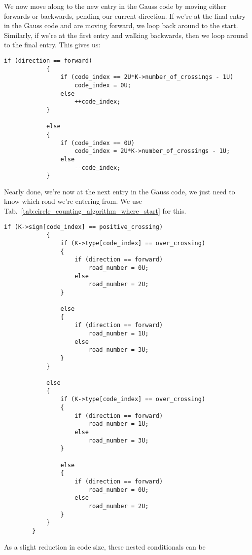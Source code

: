         We now move along to the new entry in the Gauss code by moving either
        forwards or backwards, pending our current direction. If we're at the
        final entry in the Gauss code and are moving forward, we loop back
        around to the start. Similarly, if we're at the first entry and walking
        backwards, then we loop around to the final entry. This gives us:
\begin{lstlisting}[style=CStyle, firstnumber=102]
            if (direction == forward)
            {
                if (code_index == 2U*K->number_of_crossings - 1U)
                    code_index = 0U;
                else
                    ++code_index;
            }

            else
            {
                if (code_index == 0U)
                    code_index = 2U*K->number_of_crossings - 1U;
                else
                    --code_index;
            }
\end{lstlisting}
        Nearly done, we're now at the next entry in the Gauss code, we just need
        to know which road we're entering from. We use
        Tab.~\ref{tab:circle_counting_algorithm_where_start} for this.
\begin{lstlisting}[style=CStyle, firstnumber = 118]
            if (K->sign[code_index] == positive_crossing)
            {
                if (K->type[code_index] == over_crossing)
                {
                    if (direction == forward)
                        road_number = 0U;
                    else
                        road_number = 2U;
                }

                else
                {
                    if (direction == forward)
                        road_number = 1U;
                    else
                        road_number = 3U;
                }
            }

            else
            {
                if (K->type[code_index] == over_crossing)
                {
                    if (direction == forward)
                        road_number = 1U;
                    else
                        road_number = 3U;
                }

                else
                {
                    if (direction == forward)
                        road_number = 0U;
                    else
                        road_number = 2U;
                }
            }
        }
\end{lstlisting}
        As a slight reduction in code size, these nested conditionals can be
